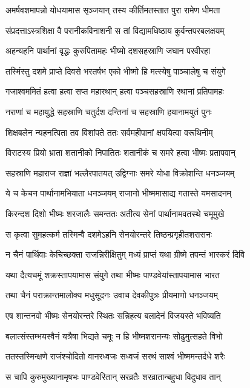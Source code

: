 \twolineshloka
{अमर्षवशमापन्नो योधयामास सृञ्जयान्}
{तस्य कीर्तिमतस्तात पुरा रामेण धीमता}


\twolineshloka
{संप्रदत्ताऽस्त्रशिक्षा वै परानीकविनाशनी}
{स तां विद्यामधिष्ठाय कुर्वन्तपरबलक्षयम्}


\twolineshloka
{अहन्यहनि पार्थानां वृद्धः कुरुपितामहः}
{भीष्मो दशसहस्राणि जघान परवीरहा}


\twolineshloka
{तस्मिंस्तु दशमे प्राप्ते दिवसे भरतर्षभ}
{एको भीष्मो हि मत्स्येषु पाञ्चालेषु च संयुगे}


\twolineshloka
{गजाश्वममितं हत्वा हत्वा सप्त महारथान्}
{हत्वा पञ्चसहस्राणि रथानां प्रतिपामहः}


\twolineshloka
{नराणां च महायुद्धे सहस्राणि चतुर्दश}
{दन्तिनां च सहस्राणि हयानामयुतं पुनः}


\twolineshloka
{शिक्षबलेन न्यहनत्पिता तव विशांपते}
{ततः सर्वमहीपानां क्षपयित्वा वरूथिनीम्}


\twolineshloka
{विराटस्य प्रियो भ्राता शतानीको निपातितः}
{शतानीकं च समरे हत्वा भीष्मः प्रतापवान्}


\twolineshloka
{सहस्राणि महाराज राज्ञां भल्लैरपातयत्}
{उद्विग्नाः समरे योधा विक्रोशन्ति धनञ्जयम्}


\twolineshloka
{ये च केचन पार्थानामभियाता धनञ्जयम्}
{राजानो भीष्ममासाद्य गतास्ते यमसादनम्}


\twolineshloka
{किरन्दश दिशो भीष्मः शरजालैः समन्ततः}
{अतीत्य सेनां पार्थानामवतस्थे चमूमुखे}


\twolineshloka
{स कृत्वा सुमहत्कर्म तस्मिन्वै दशमेऽहनि}
{सेनयोरन्तरे तिष्ठन्प्रगृहीतशरासनः}


\twolineshloka
{न चैनं पार्थिवाः केचिच्छक्ता राजन्निरीक्षितुम्}
{मध्यं प्राप्तं यथा ग्रीष्मे तपन्तं भास्करं दिवि}


\twolineshloka
{यथा दैत्यचमूं शक्रस्तापयामास संयुगे}
{तथा भीष्मः पाण्डवेयांस्तापयामास भारत}


\twolineshloka
{तथा चैनं पराक्रान्तमालोक्य मधुसूदनः}
{उवाच देवकीपुत्रः प्रीयमाणो धनञ्जयम्}


\twolineshloka
{एष शान्तनवो भीष्मः सेनयोरन्तरे स्थितः}
{सन्निहत्य बलादेनं विजयस्ते भविष्यति}


\twolineshloka
{बलात्संस्तम्भयस्वैनं यत्रैषा भिद्यते चमूः}
{न हि भीष्मशरानन्यः सोढुमुत्सहते विभो}


\twolineshloka
{ततस्तस्मिन्क्षणे राजंश्चोदितो वानरध्वजः}
{सध्वजं सरथं साश्वं भीष्ममन्तर्दधे शरैः}


\twolineshloka
{स चापि कुरुमुख्यानामृषभः पाण्डवेरितान्}
{सरव्रतैः शरव्रातान्बहुधा विदुधाव तान्}


